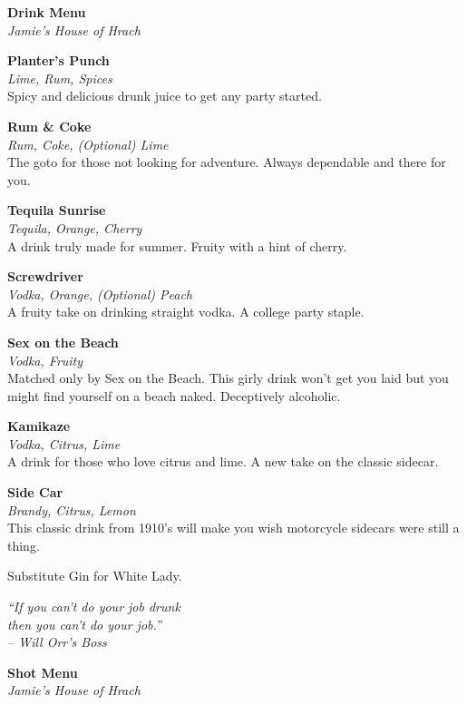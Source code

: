 \documentclass[12pt]{article}
\newcommand{\drink}[3]{
    \begin{center}
        \noindent\large \textbf{#1}\\
        \small \textit{#2}\\
        \normalsize #3\\
        \vspace{8 mm}
    \end{center}
}
\begin{document}
   \begin{center}
       \LARGE \textbf{Drink Menu} \\
       \small \textit{Jamie's House of Hrach} \\
       \hrulefill
   \end{center}

   \begin{multicols}{2}
       \drink{Planter's Punch}{Lime, Rum, Spices}{
          Spicy and delicious drunk juice to get any party started.
       }

       \drink{Rum \& Coke}{Rum, Coke, (Optional) Lime}{
           The goto for those not looking for adventure.
           Always dependable and there for you.
       }

       \drink{Tequila Sunrise}{Tequila, Orange, Cherry}{
           A drink truly made for summer. Fruity with a hint of cherry.
       }

       \drink{Screwdriver}{Vodka, Orange, (Optional) Peach}{
           A fruity take on drinking straight vodka. A college party staple.
       }

       \columnbreak

       \drink{Sex on the Beach}{Vodka, Fruity}{
           Matched only by Sex on the Beach. This girly drink won't get you laid
           but you might find yourself on a beach naked. Deceptively alcoholic.
       }

      \drink{Kamikaze}{Vodka, Citrus, Lime}{
         A drink for those who love citrus and lime. A new take on the classic sidecar.
      }

      \drink{Side Car}{Brandy, Citrus, Lemon}{
         This classic drink from 1910's will make you wish motorcycle sidecars
         were still a thing.

         Substitute Gin for White Lady.
      }

      \end{multicols}

      \vfill
      \begin{center}
      \noindent\textit{
          ``If you can't do your job drunk \\
          then you can't do your job.'' \\
          -- Will Orr's Boss
       }
   \end{center}
   \clearpage

   \begin{center}
      \LARGE \textbf{Shot Menu} \\
      \small \textit{Jamie's House of Hrach} \\
      \hrulefill
      \end{center}
\end{document}
